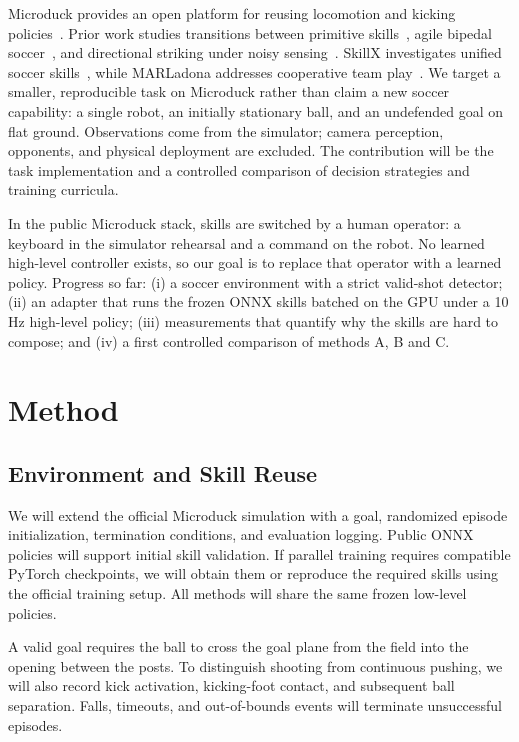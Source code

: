 \documentclass[10pt,twocolumn,letterpaper]{article}
\begin{document}
Microduck provides an open platform for reusing locomotion and kicking policies~\cite{microduck}. Prior work studies transitions between primitive skills~\cite{lee}, agile bipedal soccer~\cite{haarnoja}, and directional striking under noisy sensing~\cite{xu}. SkillX investigates unified soccer skills~\cite{skillx}, while MARLadona addresses cooperative team play~\cite{marladona}. We target a smaller, reproducible task on Microduck rather than claim a new soccer capability: a single robot, an initially stationary ball, and an undefended goal on flat ground. Observations come from the simulator; camera perception, opponents, and physical deployment are excluded. The contribution will be the task implementation and a controlled comparison of decision strategies and training curricula.

{\color{blue}In the public Microduck stack, skills are switched by a human operator: a keyboard in the simulator rehearsal and a command on the robot. No learned high-level controller exists, so our goal is to replace that operator with a learned policy. Progress so far: (i) a soccer environment with a strict valid-shot detector; (ii) an adapter that runs the frozen ONNX skills batched on the GPU under a 10\,Hz high-level policy; (iii) measurements that quantify why the skills are hard to compose; and (iv) a first controlled comparison of methods A, B and C.\par}

\section{Method}
\subsection{Environment and Skill Reuse}
We will extend the official Microduck simulation with a goal, randomized episode initialization, termination conditions, and evaluation logging. Public ONNX policies will support initial skill validation. If parallel training requires compatible PyTorch checkpoints, we will obtain them or reproduce the required skills using the official training setup. All methods will share the same frozen low-level policies.

A valid goal requires the ball to cross the goal plane from the field into the opening between the posts. To distinguish shooting from continuous pushing, we will also record kick activation, kicking-foot contact, and subsequent ball separation. Falls, timeouts, and out-of-bounds events will terminate unsuccessful episodes.
\end{document}
